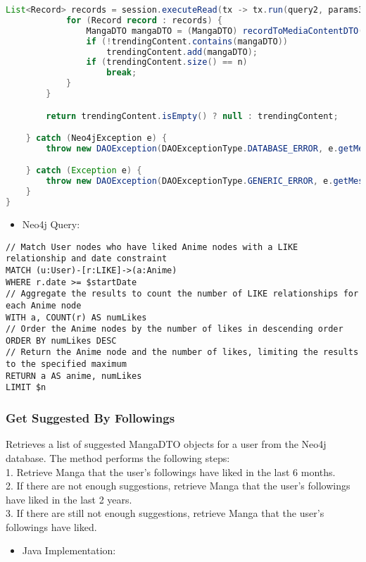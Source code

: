 \begin{mdframed}[style=customstyle]
\begin{lstlisting}[language=java]
            List<Record> records = session.executeRead(tx -> tx.run(query2, params3).list());
            for (Record record : records) {
                MangaDTO mangaDTO = (MangaDTO) recordToMediaContentDTO(record);
                if (!trendingContent.contains(mangaDTO))
                    trendingContent.add(mangaDTO);
                if (trendingContent.size() == n)
                    break;
            }
        }

        return trendingContent.isEmpty() ? null : trendingContent;

    } catch (Neo4jException e) {
        throw new DAOException(DAOExceptionType.DATABASE_ERROR, e.getMessage());

    } catch (Exception e) {
        throw new DAOException(DAOExceptionType.GENERIC_ERROR, e.getMessage());
    }
}\end{lstlisting}
\end{mdframed}

\begin{itemize}
    \item Neo4j Query:
\end{itemize}

\begin{mdframed}[style=customstyle]
\begin{lstlisting}[language=Cypher]
// Match User nodes who have liked Anime nodes with a LIKE relationship and date constraint
MATCH (u:User)-[r:LIKE]->(a:Anime)
WHERE r.date >= $startDate
// Aggregate the results to count the number of LIKE relationships for each Anime node
WITH a, COUNT(r) AS numLikes
// Order the Anime nodes by the number of likes in descending order
ORDER BY numLikes DESC
// Return the Anime node and the number of likes, limiting the results to the specified maximum
RETURN a AS anime, numLikes
LIMIT $n\end{lstlisting}
\end{mdframed}

\newpage

\subsubsection*{Get Suggested By Followings}

Retrieves a list of suggested MangaDTO objects for a user from the Neo4j database.
The method performs the following steps:\\
1. Retrieve Manga that the user's followings have liked in the last 6 months.\\
2. If there are not enough suggestions, retrieve Manga that the user's followings have liked in the last 2 years.\\
3. If there are still not enough suggestions, retrieve Manga that the user's followings have liked.
\begin{itemize}
    \item Java Implementation:
\end{itemize}

